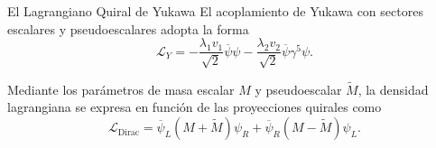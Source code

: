 \begin{block}{El Lagrangiano Quiral de Yukawa}
  El acoplamiento de Yukawa con sectores escalares y pseudoescalares
  adopta la forma
  \begin{equation}
    \mathcal{L}_{Y} = -\frac{\lambda_{1}v_{1}}{\sqrt{2}}\overline{\psi}\psi
    - \frac{\lambda_{2}v_{2}}{\sqrt{2}}\overline{\psi}\gamma^{5}\psi.
  \end{equation}

  Mediante los parámetros de masa escalar $M$ y pseudoescalar $\tilde{M}$,
  la densidad lagrangiana se expresa en función de las proyecciones
  quirales como
  \begin{equation}
    \mathcal{L}_{\text{Dirac}} = \overline{\psi}_{L}(M+\tilde{M})\psi_{R}
    + \overline{\psi}_{R}(M-\tilde{M})\psi_{L}.
  \end{equation}
\end{block}

